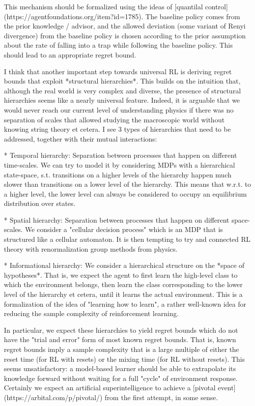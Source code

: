 \documentclass[a4paper]{article}
\begin{document}
This mechanism should be formalized using the ideas of [quantilal control](https://agentfoundations.org/item?id=1785). The baseline policy comes from the prior knowledge / advisor, and the allowed deviation (some variant of Renyi divergence) from the baseline policy is chosen according to the prior assumption about the rate of falling into a trap while following the baseline policy. This should lead to an appropriate regret bound.

I think that another important step towards universal RL is deriving regret bounds that exploit *structural hierarchies*. This builds on the intuition that, although the real world is very complex and diverse, the presence of structural hierarchies seems like a nearly universal feature. Indeed, it is arguable that we would never reach our current level of understanding physics if there was no separation of scales that allowed studying the macroscopic world without knowing string theory et cetera. I see 3 types of hierarchies that need to be addressed, together with their mutual interactions:

* Temporal hierarchy: Separation between processes that happen on different time-scales. We can try to model it by considering MDPs with a hierarchical state-space, s.t. transitions on a higher levels of the hierarchy happen much slower than transitions on a lower level of the hierarchy. This means that w.r.t. to a higher level, the lower level can always be considered to occupy an equilibrium distribution over states.

* Spatial hierarchy: Separation between processes that happen on different space-scales. We consider a "cellular decision process" which is an MDP that is structured like a cellular automaton. It is then tempting to try and connected RL theory with renormalization group methods from physics.

* Informational hierarchy: We consider a hierarchical structure on the *space of hypotheses*. That is, we expect the agent to first learn the high-level class to which the environment belongs, then learn the class corresponding to the lower level of the hierarchy et cetera, until it learns the actual environment. This is a formalization of the idea of "learning how to learn", a rather well-known idea for reducing the sample complexity of reinforcement learning.

In particular, we expect these hierarchies to yield regret bounds which do not have the "trial and error" form of most known regret bounds. That is, known regret bounds imply a sample complexity that is a large multiple of either the reset time (for RL with resets) or the mixing time (for RL without resets). This seems unsatisfactory: a model-based learner should be able to extrapolate its knowledge forward without waiting for a full "cycle" of environment response. Certainly we expect an artificial superintelligence to achieve a [pivotal event](https://arbital.com/p/pivotal/) from the first attempt, in some sense.
\end{document}
